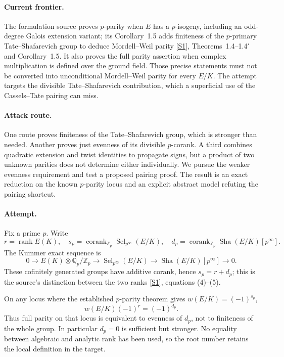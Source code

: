 \documentclass[11pt,a4paper]{article}
\newcommand{\Z}{\mathbb{Z}}
\newcommand{\Q}{\mathbb{Q}}
\newcommand{\sref}[2]{\hyperlink{source:#1:#2}{[S#2]}}
\numberwithin{equation}{section}
\begin{document}
\paragraph{Current frontier.}
The formulation source proves $p$-parity when $E$ has a $p$-isogeny, including an odd-degree Galois extension variant; its Corollary~1.5 adds finiteness of the $p$-primary Tate--Shafarevich group to deduce Mordell--Weil parity \sref{196}{1}, Theorems~1.4--1.4$'$ and Corollary~1.5. It also proves the full parity assertion when complex multiplication is defined over the ground field. Those precise statements must not be converted into unconditional Mordell--Weil parity for every $E/K$. The attempt targets the divisible Tate--Shafarevich contribution, which a superficial use of the Cassels--Tate pairing can miss.

\paragraph{Attack route.}
One route proves finiteness of the Tate--Shafarevich group, which is stronger than needed. Another proves just evenness of its divisible $p$-corank. A third combines quadratic extension and twist identities to propagate signs, but a product of two unknown parities does not determine either individually. We pursue the weaker evenness requirement and test a proposed pairing proof. The result is an exact reduction on the known $p$-parity locus and an explicit abstract model refuting the pairing shortcut.

\paragraph{Attempt.}
Fix a prime $p$. Write
\[
 r=\operatorname{rank}E(K),\quad s_p=\operatorname{corank}_{\Z_p}
       \operatorname{Sel}_{p^\infty}(E/K),\quad
 d_p=\operatorname{corank}_{\Z_p}\operatorname{Sha}(E/K)[p^\infty].
\]
The Kummer exact sequence is
\begin{equation}\label{eq196:selmer}
 0\longrightarrow E(K)\otimes\Q_p/\Z_p
 \longrightarrow\operatorname{Sel}_{p^\infty}(E/K)
 \longrightarrow\operatorname{Sha}(E/K)[p^\infty]\longrightarrow0.
\end{equation}
These cofinitely generated groups have additive corank, hence $s_p=r+d_p$; this is the source's distinction between the two ranks \sref{196}{1}, equations (4)--(5).

On any locus where the established $p$-parity theorem gives $w(E/K)=(-1)^{s_p}$,
\begin{equation}\label{eq196:defect}
 w(E/K)(-1)^r=(-1)^{d_p}.
\end{equation}
Thus full parity on that locus is equivalent to evenness of $d_p$, not to finiteness of the whole group. In particular $d_p=0$ is sufficient but stronger. No equality between algebraic and analytic rank has been used, so the root number retains the local definition in the target.
\end{document}
